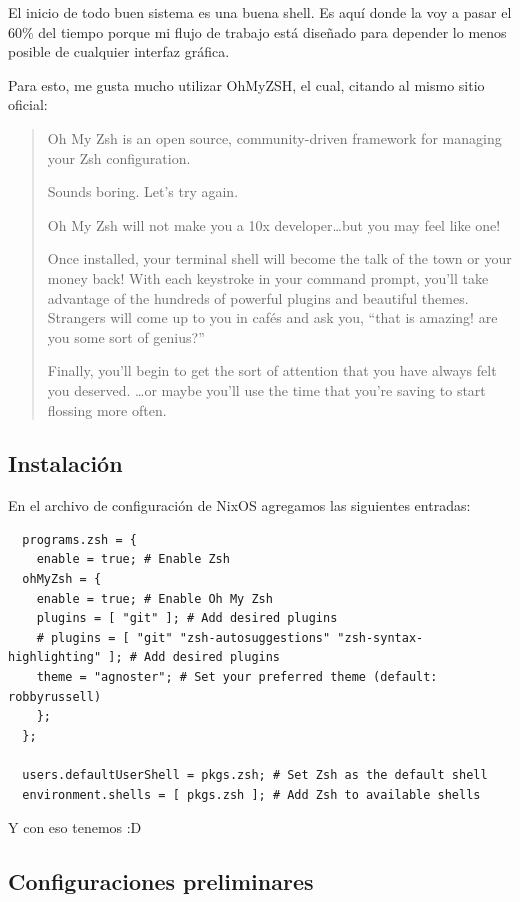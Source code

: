 \documentclass[11pt]{article}
\begin{document}
El inicio de todo buen sistema es una buena shell. Es aquí donde la voy a pasar el 60\% del tiempo porque mi flujo de trabajo está diseñado para depender lo menos posible de cualquier interfaz gráfica.

Para esto, me gusta mucho utilizar OhMyZSH, el cual, citando al mismo sitio oficial:

\begin{quote}
Oh My Zsh is an open source, community-driven framework for managing your Zsh configuration.

Sounds boring. Let's try again.

Oh My Zsh will not make you a 10x developer\ldots{}but you may feel like one!

Once installed, your terminal shell will become the talk of the town or your money back! With each keystroke in your command prompt, you'll take advantage of the hundreds of powerful plugins and beautiful themes. Strangers will come up to you in cafés and ask you, ``that is amazing! are you some sort of genius?''

Finally, you'll begin to get the sort of attention that you have always felt you deserved. \ldots{}or maybe you'll use the time that you're saving to start flossing more often. 😬
\end{quote}
\subsection{Instalación}
\label{sec:org976f9da}

En el archivo de configuración de NixOS agregamos las siguientes entradas:

\begin{verbatim}
  programs.zsh = {
    enable = true; # Enable Zsh
  ohMyZsh = {
    enable = true; # Enable Oh My Zsh
    plugins = [ "git" ]; # Add desired plugins
    # plugins = [ "git" "zsh-autosuggestions" "zsh-syntax-highlighting" ]; # Add desired plugins
    theme = "agnoster"; # Set your preferred theme (default: robbyrussell)
    };
  };

  users.defaultUserShell = pkgs.zsh; # Set Zsh as the default shell
  environment.shells = [ pkgs.zsh ]; # Add Zsh to available shells
\end{verbatim}

Y con eso tenemos :D
\subsection{Configuraciones preliminares}
\label{sec:org87d0aa3}
\end{document}
